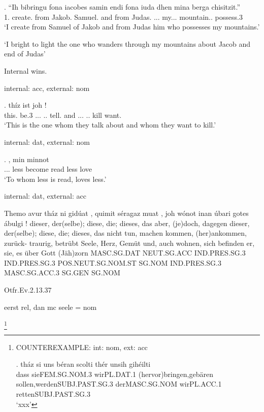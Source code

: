 \exg. ``Ih bibringu fona iacobes samin endi fona iuda dhen mina berga chisitzit.''\\
1. create. from Jakob. Samuel. and from Judas. ... my... mountain.. possess.3\\
`I create from Samuel of Jakob and from Judas him who possesses my mountains.' \label{ex:ohg-acc-nom}

`I bright to light the one who wanders through my mountains about Jacob and end of Judas'


Internal wins.

internal: acc, external: nom

\exg. thíz ist  joh !\\
this. be.3\scsub{[nom]} ... .. tell.\scsub{[acc]} and ... .. kill\scsub{[acc]} want.\\
`This is the one whom they talk about and whom they want to kill.' 



internal: dat, external: nom

\exg. , min minnot\\
... less become\scsub{[dat]} read less love\scsub{[nom]}\\
`To whom less is read, loves less.'


internal: dat, external: acc

Themo	avur	tház	ni	gidúat	,	quimit	séragaz	muat	,	joh	wónot	inan	úbari	gotes	ábulgi	!
dieser, der(selbe); diese, die; dieses, das	aber, (je)doch, dagegen	dieser, der(selbe); diese, die; dieses, das	nicht	tun, machen		kommen, (her)ankommen, zurück-	traurig, betrübt	Seele, Herz, Gemüt		und, auch	wohnen, sich befinden	er, sie, es	über	Gott	(Jäh)zorn
MASC.SG.DAT		NEUT.SG.ACC		IND.PRES.SG.3		IND.PRES.SG.3	POS.NEUT.SG.NOM.ST	SG.NOM			IND.PRES.SG.3	MASC.SG.ACC.3		SG.GEN	SG.NOM

Otfr.Ev.2.13.37

eerst rel, dan mc
seele = nom


\footnote{
COUNTEREXAMPLE: int: nom, ext: acc

\exg. tház si uns béran scolti thér unsih gihéilti\\
dass sieFEM.SG.NOM.3 wirPL.DAT.1 (hervor)bringen,gebären sollen,werdenSUBJ.PAST.SG.3 derMASC.SG.NOM wirPL.ACC.1 rettenSUBJ.PAST.SG.3\\
 `xxx' 

 \phantom{x}
}

